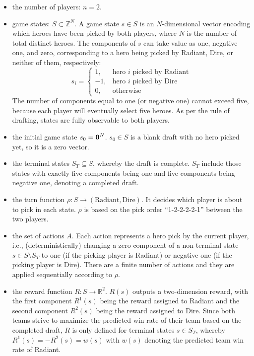 \begin{itemize}[leftmargin=*]
\item the number of players: $n = 2$.
\item game states: $S \subset \mathbb{Z}^{N}$. A game state $s \in S$ is an $N$-dimensional vector encoding which heroes have been picked by both players, where $N$ is the number of total distinct heroes. The components of $s$ can take value as one, negative one, and zero, corresponding to a hero being picked by Radiant, Dire, or neither of them, respectively:
\begin{equation}
s_{i}=
\begin{cases}
  1, & \text{hero } i \text{ picked by Radiant} \\
  -1, & \text{hero } i \text{ picked by Dire} \\
  0, & \text{otherwise}
\end{cases}
\label{eqn:sifeature}
\end{equation}
The number of components equal to one (or negative one) cannot exceed five, because each player will eventually select five heroes. As per the rule of drafting, states are fully observable to both players. 
\item the initial game state $s_0 = \boldsymbol{0}^N$. $s_0 \in S$ is a blank draft with no hero picked yet, so it is a zero vector. 
\item the terminal states $S_T \subseteq S$, whereby the draft is complete. $S_T$ include those states with exactly five components being one and five components being negative one, denoting a completed draft.
\item the turn function $\rho: S \rightarrow (\text{Radiant}, \text{Dire})$. It decides which player is about to pick in each state. $\rho$ is based on the pick order ``1-2-2-2-2-1'' between the two players.   
\item the set of actions $A$. Each action represents a hero pick by the current player, i.e., (deterministically) changing a zero component of a non-terminal state $s \in S \setminus S_T$ to one (if the picking player is Radiant) or negative one (if the picking player is Dire). There are a finite number of actions and they are applied sequentially according to $\rho$. 
\item the reward function $R: S \rightarrow \mathbb{R}^2$. $R(s)$ outputs a two-dimension reward, with the first component $R^1(s)$ being the reward assigned to Radiant and the second component $R^2(s)$ being the reward assigned to Dire. Since both teams strive to maximize the predicted win rate of their team based on the completed draft, $R$ is only defined for terminal states $s \in S_T$, whereby $R^1(s)=-R^2(s)=w(s)$ with $w(s)$ denoting the predicted team win rate of Radiant. 
\end{itemize}

